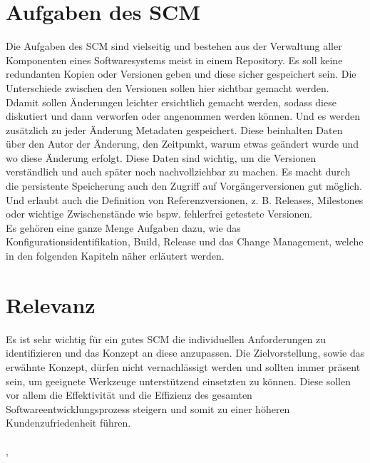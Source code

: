 \section{Aufgaben des SCM}
Die Aufgaben des \acs{SCM} sind vielseitig und bestehen aus der Verwaltung aller Komponenten eines Softwaresystems meist in einem Repository. Es soll keine redundanten Kopien oder Versionen geben und diese sicher gespeichert sein. Die Unterschiede zwischen den Versionen sollen hier sichtbar gemacht werden. Ddamit sollen Änderungen leichter ersichtlich gemacht werden, sodass diese diskutiert und dann verworfen oder angenommen werden können. Und es werden zusätzlich zu jeder Änderung Metadaten gespeichert. Diese beinhalten Daten über den Autor der Änderung, den Zeitpunkt, warum etwas geändert wurde und wo diese Änderung erfolgt. Diese Daten sind wichtig, um die Versionen verständlich und auch später noch nachvollziehbar zu machen. Es macht durch die persistente Speicherung auch den Zugriff auf Vorgängerversionen gut möglich. Und erlaubt auch die Definition von Referenzversionen, \acs{z. B.} Releases, Milestones oder wichtige Zwischenstände wie bspw. fehlerfrei getestete Versionen.
\\
Es gehören eine ganze Menge Aufgaben dazu, wie das Konfigurationsidentifikation, Build, Release und das Change Management, welche in den folgenden Kapiteln näher erläutert werden.
\cite{scm-unibonn}
\section{Relevanz}
Es ist sehr wichtig für ein gutes \acs{SCM} die individuellen Anforderungen zu identifizieren und das Konzept an diese anzupassen. Die Zielvorstellung, sowie das erwähnte Konzept, dürfen nicht vernachlässigt werden und sollten immer präsent sein, um geeignete Werkzeuge unterstützend einsetzten zu können. Diese sollen vor allem die Effektivität und die Effizienz des gesamten Softwareentwicklungsprozess steigern und somit zu einer höheren Kundenzufriedenheit führen.
\\\\
\cite{scm-agil}, \cite{scm-pearson}
